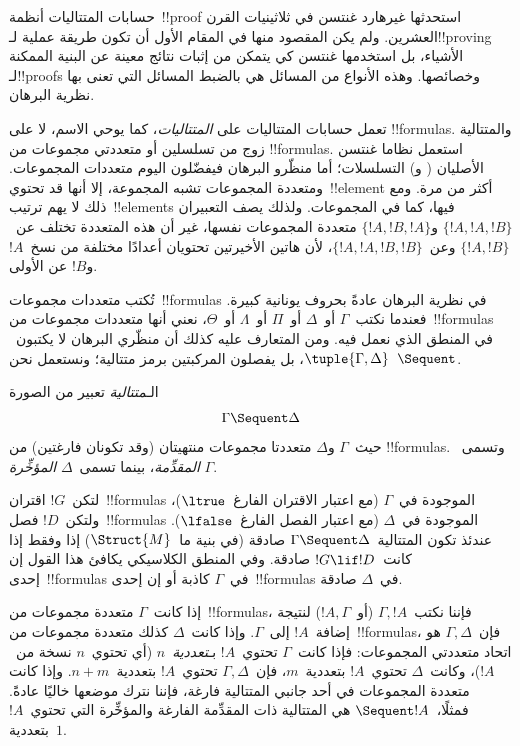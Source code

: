 \documentclass[../../../include/open-logic-section]{subfiles}
\begin{document}


حسابات المتتاليات أنظمة~!!{proof} استحدثها غيرهارد غنتسن في ثلاثينيات
القرن العشرين. ولم يكن المقصود منها في المقام الأول أن تكون طريقة عملية
لـ!!{proving} الأشياء، بل استخدمها غنتسن كي يتمكن من إثبات نتائج معينة
عن البنية الممكنة لـ!!{proof}s وخصائصها. وهذه الأنواع من المسائل هي بالضبط
المسائل التي تعنى بها نظرية البرهان.

تعمل حسابات المتتاليات على \emph{المتتاليات}، كما يوحي الاسم، لا على
!!{formula}s. والمتتالية زوج من تسلسلين أو متعددتي مجموعات من
!!{formula}s. استعمل نظاما غنتسن الأصليان ( و)
التسلسلات؛ أما منظّرو البرهان فيفضّلون اليوم متعددات المجموعات. ومتعددة
المجموعات تشبه المجموعة، إلا أنها قد تحتوي~!!{element} أكثر من مرة. ومع
ذلك لا يهم ترتيب~!!{element}s فيها، كما في المجموعات. ولذلك يصف التعبيران
$\{!A, !A, !B\}$ و$\{!A, !B, !A\}$ متعددة المجموعات نفسها، غير أن هذه
المتعددة تختلف عن~$\{!A,!B\}$ وعن~$\{!A,!A,!B,!B\}$، لأن هاتين الأخيرتين
تحتويان أعدادًا مختلفة من نسخ~$!A$ و$!B$ عن الأولى.

تُكتب متعددات مجموعات~!!{formula}s في نظرية البرهان عادةً بحروف يونانية
كبيرة. فعندما نكتب~$\Gamma$ أو~$\Delta$ أو~$\Pi$ أو~$\Lambda$ أو~$\Theta$،
نعني أنها متعددات مجموعات من~!!{formula}s في المنطق الذي نعمل فيه. ومن
المتعارف عليه كذلك أن منظّري البرهان لا يكتبون~$\tuple{\Gamma,\Delta}$،
بل يفصلون المركبتين برمز متتالية؛ ونستعمل نحن~$\Sequent$.

\begin{defn}[متتالية]
الـ\emph{متتالية} تعبير من الصورة
\[
\Gamma \Sequent \Delta
\]
حيث~$\Gamma$ و$\Delta$ متعددتا مجموعات منتهيتان (وقد تكونان فارغتين) من
!!{formula}s. وتسمى~$\Gamma$ \emph{المقدِّمة}، بينما تسمى~$\Delta$
\emph{المؤخِّرة}.
\end{defn}

لتكن~$!G$ اقتران~!!{formula}s الموجودة في~$\Gamma$ (مع اعتبار الاقتران
الفارغ~$\ltrue$)، ولتكن~$!D$ فصل~!!{formula}s الموجودة في~$\Delta$ (مع
اعتبار الفصل الفارغ~$\lfalse$). عندئذ تكون المتتالية~$\Gamma\Sequent\Delta$
صادقة (في بنية ما~$\Struct{M}$) إذا وفقط إذا كانت~$!G\lif !D$ صادقة. وفي
المنطق الكلاسيكي يكافئ هذا القول إن إحدى~!!{formula}s في~$\Gamma$ كاذبة
أو إن إحدى~!!{formula}s في~$\Delta$ صادقة.

إذا كانت~$\Gamma$ متعددة مجموعات من~!!{formula}s، فإننا نكتب~$\Gamma,!A$
(أو~$!A,\Gamma$) لنتيجة إضافة~$!A$ إلى~$\Gamma$. وإذا كانت~$\Delta$ كذلك
متعددة مجموعات من~!!{formula}s، فإن~$\Gamma,\Delta$ هو اتحاد متعددتي
المجموعات: فإذا كانت~$\Gamma$ تحتوي~$!A$ بـ\emph{تعددية}~$n$ (أي تحتوي~$n$ نسخة
من~$!A$)، وكانت~$\Delta$ تحتوي~$!A$ بتعددية~$m$، فإن~$\Gamma,\Delta$
تحتوي~$!A$ بتعددية~$n+m$. وإذا كانت متعددة المجموعات في أحد جانبي
المتتالية فارغة، فإننا نترك موضعها خاليًا عادةً. فمثلًا،~$\Sequent !A$
هي المتتالية ذات المقدِّمة الفارغة والمؤخِّرة التي تحتوي~$!A$ بتعددية~$1$.
\end{document}
